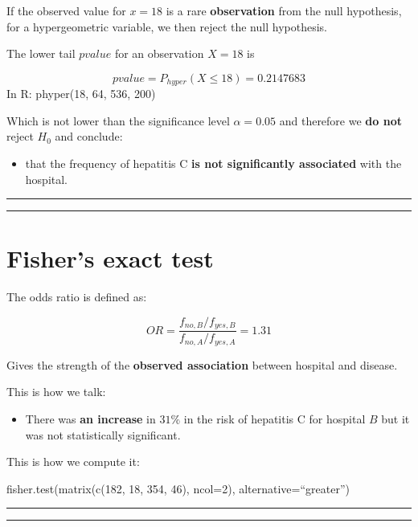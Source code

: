 \documentclass[
]{book}
\providecommand{\tightlist}{%
  \setlength{\itemsep}{0pt}\setlength{\parskip}{0pt}}
\begin{document}
If the observed value for \(x=18\) is a rare \textbf{observation} from the null hypothesis, for a hypergeometric variable, we then reject the null hypothesis.

The lower tail \(pvalue\) for an observation \(X=18\) is

\[pvalue=P_{hyper}(X \leq 18) =0.2147683\]
In R: phyper(18, 64, 536, 200)

Which is not lower than the significance level \(\alpha=0.05\) and therefore we \textbf{do not} reject \(H_0\) and conclude:

\begin{itemize}
\tightlist
\item
  that the frequency of hepatitis C \textbf{is not significantly associated} with the hospital.
\end{itemize}

\begin{center}\rule{0.5\linewidth}{0.5pt}\end{center}

\begin{center}\rule{0.5\linewidth}{0.5pt}\end{center}

\hypertarget{fishers-exact-test-3}{%
\section{Fisher's exact test}\label{fishers-exact-test-3}}

The odds ratio is defined as:

\[OR=\frac{f_{no,B}/f_{yes,B}}{f_{no,A}/f_{yes,A}}=1.31\]

Gives the strength of the \textbf{observed association} between hospital and disease.

This is how we talk:

\begin{itemize}
\tightlist
\item
  There was \textbf{an increase} in \(31\%\) in the risk of hepatitis C for hospital \(B\) but it was not statistically significant.
\end{itemize}

This is how we compute it:

fisher.test(matrix(c(182, 18, 354, 46), ncol=2), alternative=``greater'')

\begin{center}\rule{0.5\linewidth}{0.5pt}\end{center}

\begin{center}\rule{0.5\linewidth}{0.5pt}\end{center}
\end{document}
